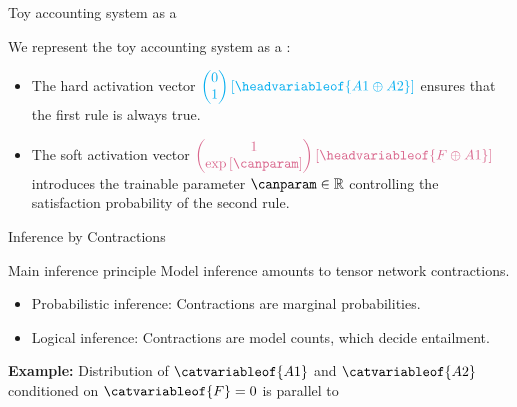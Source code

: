 \documentclass{beamer}
\begin{document}
    \begin{frame}{Toy accounting system as a \CompActNet{}}

        We represent the toy accounting system as a \ComputationActivationNetwork{}:
        \begin{center}
            
        \end{center}

        \begin{itemize}
            \item The hard activation vector $\textcolor{\concolor}{\coloredmatrixof{0 \\ 1}{\headvariableof{A1\oplus A2}}}$ ensures that the first rule is always true.
            \item The soft activation vector $\textcolor{\probcolor}{\coloredmatrixof{1 \\ \expof{\canparam}}{\headvariableof{F\oplus A1}}}$ introduces the trainable parameter $\canparam\in\rr$ controlling the satisfaction probability of the second rule.
        \end{itemize}
    \end{frame}


    \begin{frame}{Inference by Contractions}
        \begin{block}{Main inference principle}
            Model inference amounts to tensor network contractions.
        \end{block}

        \begin{itemize}
            \item Probabilistic inference: Contractions are marginal probabilities.
            \item Logical inference: Contractions are model counts, which decide entailment.
        \end{itemize}

            {\bf Example:} Distribution of $\catvariableof{A1}$ and $\catvariableof{A2}$ conditioned on $\catvariableof{F}=0$ is parallel to
        \begin{center}
            
        \end{center}

    \end{frame}
\end{document}
